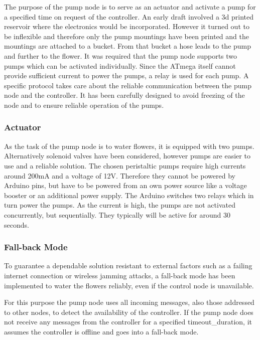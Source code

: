 The purpose of the pump node is to serve as an actuator and activate a pump for a specified time on request of the controller. An early draft involved a 3d printed reservoir where the electronics would be incorporated. However it turned out to be inflexible and therefore only the pump mountings have been printed and the mountings are attached to a bucket. From that bucket a hose leads to the pump and further to the flower.
It was required that the pump node supports two pumps which can be activated individually. Since the ATmega itself cannot provide sufficient current to power the pumps, a relay is used for each pump. %
A specific protocol takes care about the reliable communication between the pump node and the controller. It has been carefully designed to avoid freezing of the node and to ensure reliable operation of the pumps.\\

\subsubsection{Actuator}
As the task of the pump node is to water flowers, it is equipped with two pumps. Alternatively solenoid valves have been considered, however pumps are easier to use and a reliable solution. The chosen peristaltic pumps require high currents around 200mA and a voltage of 12V. Therefore they cannot be powered by Arduino pins, but have to be powered from an own power source like a voltage booster or an additional power supply. The Arduino switches two relays which in turn power the pumps. As the current is high, the pumps are not activated concurrently, but sequentially. They typically will be active for around 30 seconds.


\subsubsection{Fall-back Mode}
To guarantee a dependable solution resistant to external factors such as a failing internet connection or wireless jamming attacks, a fall-back mode has been implemented to water the flowers reliably, even if the control node is unavailable.

For this purpose the pump node uses all incoming messages, also those addressed to other nodes, to detect the availability of the controller. If the pump node does not receive any messages from the controller for a specified timeout\_duration, it assumes the controller is offline and goes into a fall-back mode.

